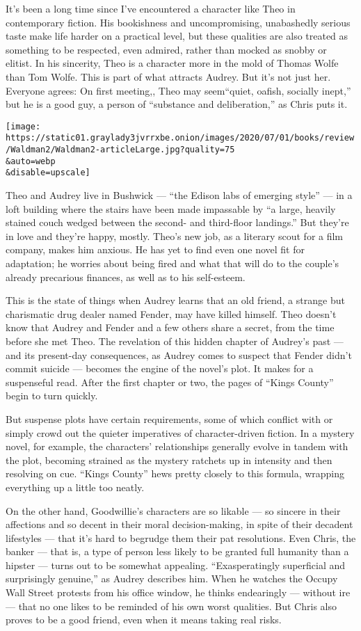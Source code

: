 It's been a long time since I've encountered a character like Theo in
contemporary fiction. His bookishness and uncompromising, unabashedly
serious taste make life harder on a practical level, but these qualities
are also treated as something to be respected, even admired, rather than
mocked as snobby or elitist. In his sincerity, Theo is a character more
in the mold of Thomas Wolfe than Tom Wolfe. This is part of what
attracts Audrey. But it's not just her. Everyone agrees: On first
meeting,, Theo may seem``quiet, oafish, socially inept,'' but he is a
good guy, a person of ``substance and deliberation,'' as Chris puts it.

\texttt{[image: https://static01.graylady3jvrrxbe.onion/images/2020/07/01/books/review/Waldman2/Waldman2-articleLarge.jpg?quality=75\\\&auto=webp\\\&disable=upscale]}

Theo and Audrey live in Bushwick --- ``the Edison labs of emerging
style'' --- in a loft building where the stairs have been made
impassable by ``a large, heavily stained couch wedged between the
second- and third-floor landings.'' But they're in love and they're
happy, mostly. Theo's new job, as a literary scout for a film company,
makes him anxious. He has yet to find even one novel fit for adaptation;
he worries about being fired and what that will do to the couple's
already precarious finances, as well as to his self-esteem.

This is the state of things when Audrey learns that an old friend, a
strange but charismatic drug dealer named Fender, may have killed
himself. Theo doesn't know that Audrey and Fender and a few others share
a secret, from the time before she met Theo. The revelation of this
hidden chapter of Audrey's past --- and its present-day consequences, as
Audrey comes to suspect that Fender didn't commit suicide --- becomes
the engine of the novel's plot. It makes for a suspenseful read. After
the first chapter or two, the pages of ``Kings County'' begin to turn
quickly.

But suspense plots have certain requirements, some of which conflict
with or simply crowd out the quieter imperatives of character-driven
fiction. In a mystery novel, for example, the characters' relationships
generally evolve in tandem with the plot, becoming strained as the
mystery ratchets up in intensity and then resolving on cue. ``Kings
County'' hews pretty closely to this formula, wrapping everything up a
little too neatly.

On the other hand, Goodwillie's characters are so likable --- so sincere
in their affections and so decent in their moral decision-making, in
spite of their decadent lifestyles --- that it's hard to begrudge them
their pat resolutions. Even Chris, the banker --- that is, a type of
person less likely to be granted full humanity than a hipster --- turns
out to be somewhat appealing. ``Exasperatingly superficial and
surprisingly genuine,'' as Audrey describes him. When he watches the
Occupy Wall Street protests from his office window, he thinks
endearingly --- without ire --- that no one likes to be reminded of his
own worst qualities. But Chris also proves to be a good friend, even
when it means taking real risks.

